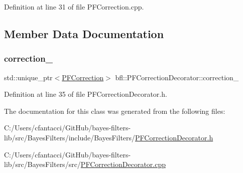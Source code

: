 Definition at line 31 of file P\+F\+Correction.\+cpp.



\subsection{Member Data Documentation}
\mbox{\label{classbfl_1_1PFCorrectionDecorator_ac4a59d72d92138a22ca7894588b54c6a}} 
\subsubsection{\texorpdfstring{correction\+\_\+}{correction\_}}
{\footnotesize\ttfamily std\+::unique\+\_\+ptr$<$\mbox{\hyperlink{classbfl_1_1PFCorrection}{P\+F\+Correction}}$>$ bfl\+::\+P\+F\+Correction\+Decorator\+::correction\+\_\+\hspace{0.3cm}{\ttfamily [private]}}



Definition at line 35 of file P\+F\+Correction\+Decorator.\+h.



The documentation for this class was generated from the following files\+:\begin{DoxyCompactItemize}
\item 
C\+:/\+Users/cfantacci/\+Git\+Hub/bayes-\/filters-\/lib/src/\+Bayes\+Filters/include/\+Bayes\+Filters/\mbox{\hyperlink{PFCorrectionDecorator_8h}{P\+F\+Correction\+Decorator.\+h}}\item 
C\+:/\+Users/cfantacci/\+Git\+Hub/bayes-\/filters-\/lib/src/\+Bayes\+Filters/src/\mbox{\hyperlink{PFCorrectionDecorator_8cpp}{P\+F\+Correction\+Decorator.\+cpp}}\end{DoxyCompactItemize}
